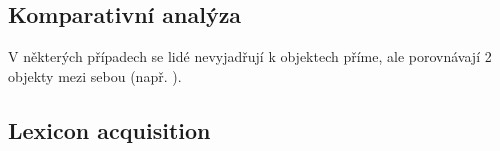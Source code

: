 \subsection{Komparativní analýza}
V některých případech se lidé nevyjadřují k objektech příme, ale porovnávají 2 objekty mezi sebou (např. ).
\subsection{Lexicon acquisition}
\blind[2]
		

